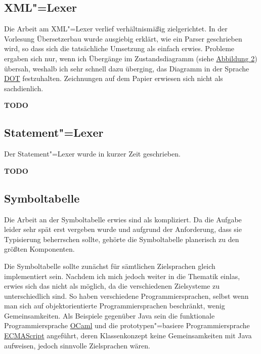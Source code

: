 \documentclass[10pt,a4paper,ngerman,titlepage,tocindentauto]{scrartcl}
\newcommand{\TODO}{ {\LARGE\bf\color{crimson} TODO} }
\begin{document}
		\subsection{XML"=Lexer}
			Die Arbeit am XML"=Lexer verlief verhältnismäßig zielgerichtet. In der Vorlesung
			Übersetzerbau wurde ausgiebig erklärt, wie ein Parser geschrieben wird, so dass
			sich die tatsächliche Umsetzung als einfach erwies. Probleme ergaben sich nur,
			wenn ich Übergänge im Zustandsdiagramm (siehe \hyperlink{Uebergangsdiagramm_XML_Lexer}{Abbildung 2})
			übersah, weshalb ich sehr schnell dazu überging, das Diagramm in der Sprache
			\href{http://www.graphviz.org/doc/info/lang.html}{DOT} festzuhalten. Zeichnungen auf
			dem Papier erwiesen sich nicht als sachdienlich.
		
			\TODO
		
		\subsection{Statement"=Lexer}
			Der Statement"=Lexer wurde in kurzer Zeit geschrieben.
			
			\TODO
		
		\subsection{Symboltabelle}
			Die Arbeit an der Symboltabelle erwies sind als kompliziert. Da die Aufgabe leider sehr spät erst
			vergeben wurde und aufgrund der Anforderung, dass sie Typisierung beherrschen sollte, gehörte
			die Symboltabelle planerisch zu den größten Komponenten.
			
			
			Die Symboltabelle sollte zunächst für sämtlichen Zielsprachen gleich implementiert sein. Nachdem
			ich mich jedoch weiter in die Thematik einlas, erwies sich das nicht als möglich, da die verschiedenen
			Zielsysteme zu unterschiedlich sind. So haben verschiedene Programmiersprachen, selbst wenn man
			sich auf objektorientierte Programmiersprachen beschränkt, wenig Gemeinsamkeiten. Als Beispiele gegenüber
			Java sein die funktionale Programmiersprache \href{http://caml.inria.fr/ocaml/}{OCaml} und die prototypen"=basiere
			Programmiersprache \href{http://www.ecma-international.org/publications/standards/Ecma-262.htm}{ECMAScript}
			angeführt, deren Klassenkonzept keine Gemeinsamkeiten mit Java aufweisen, jedoch sinnvolle Zielsprachen
			wären.
			
\end{document}
